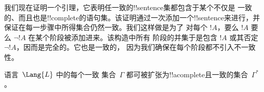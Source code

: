 \documentclass[../../../include/open-logic-section]{subfiles}
\begin{document}
      {}
      {}


\begin{explain}
我们现在证明一个引理，它表明任一致的!!{sentence}集都包含于某个不仅是
一致的、而且也是!!{complete}的语句集。该证明通过一次添加一个!!{sentence}来进行，并保证在每一步骤中所得集合仍然一致。我们这样做是为了
对每个 $!A$，要么 $!A$ 要么 $\lnot !A$ 在某个阶段被添加进来。该构造中所有
阶段的并集于是包含 $!A$ 或其否定~$\lnot !A$，因而是完全的。它也是一致的，
因为我们确保在每个阶段都不引入不一致性。
\end{explain}

\begin{lem}
 语言~$\Lang{L}$ 中的每个一致
集合~$\Gamma$ 都可被扩张为!!a{complete}且一致的集合~$\Gamma^*$。
\end{lem}
\end{document}
